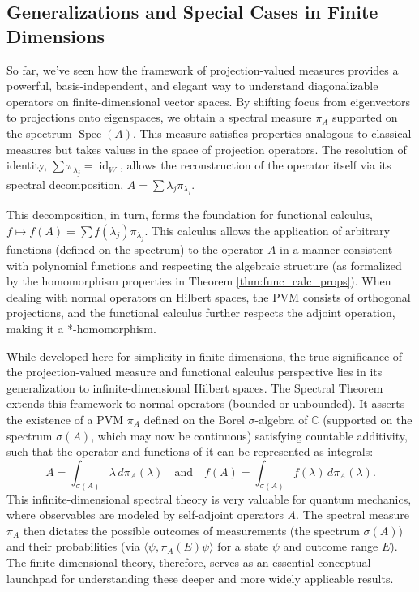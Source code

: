 \subsection{Generalizations and Special Cases in Finite Dimensions}
\label{sec:special_cases_finite}

So far, we've seen how the framework of projection-valued measures provides a powerful, basis-independent, and elegant way to understand diagonalizable operators on finite-di\-men\-si\-o\-nal vector spaces. By shifting focus from eigenvectors to projections onto eigenspaces, we obtain a spectral measure $\pi_A$ supported on the spectrum $\operatorname{Spec}(A)$. This measure satisfies properties analogous to classical measures but takes values in the space of projection operators. The resolution of identity, $\sum \pi_{\lambda_j} = \operatorname{id}_W$, allows the reconstruction of the operator itself via its spectral decomposition, $A = \sum \lambda_j \pi_{\lambda_j}$.

This decomposition, in turn, forms the foundation for functional calculus, $f \mapsto f(A) = \sum f(\lambda_j) \pi_{\lambda_j}$. This calculus allows the application of arbitrary functions (defined on the spectrum) to the operator $A$ in a manner consistent with polynomial functions and respecting the algebraic structure (as formalized by the homomorphism properties in Theorem \ref{thm:func_calc_props}). When dealing with normal operators on Hilbert spaces, the PVM consists of orthogonal projections, and the functional calculus further respects the adjoint operation, making it a *-homomorphism.

While developed here for simplicity in finite dimensions, the true significance of the projection-valued measure and functional calculus perspective lies in its generalization to infinite-dimensional Hilbert spaces. The Spectral Theorem extends this framework to normal operators (bounded or unbounded). It asserts the existence of a PVM $\pi_A$ defined on the Borel $\sigma$-algebra of $\mathbb{C}$ (supported on the spectrum $\sigma(A)$, which may now be continuous) satisfying countable additivity, such that the operator and functions of it can be represented as integrals:
\[ A = \int_{\sigma(A)} \lambda \, d\pi_A(\lambda) \quad \text{and} \quad f(A) = \int_{\sigma(A)} f(\lambda) \, d\pi_A(\lambda). \]
This infinite-dimensional spectral theory is very valuable for quantum mechanics, where observables are modeled by self-adjoint operators $A$. The spectral measure $\pi_A$ then dictates the possible outcomes of measurements (the spectrum $\sigma(A)$) and their probabilities (via $\langle \psi, \pi_A(E) \psi \rangle$ for a state $\psi$ and outcome range $E$). The finite-dimensional theory, therefore, serves as an essential conceptual launchpad for understanding these deeper and more widely applicable results.

